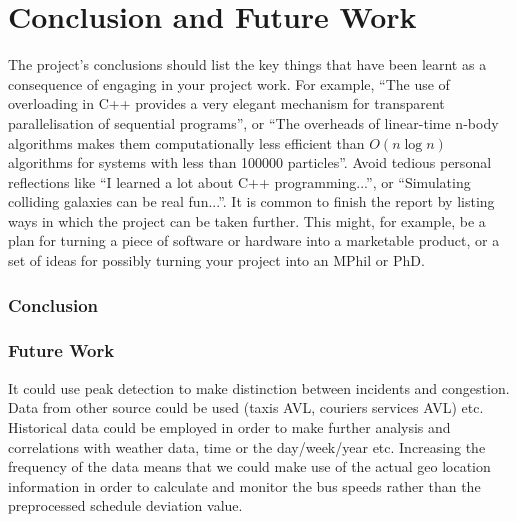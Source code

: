 \chapter{Conclusion and Future Work}

The project's conclusions should list the key things that have been learnt as a consequence of engaging in your project work. For example, ``The use of overloading in C++ provides a very elegant mechanism for transparent parallelisation of sequential programs'', or ``The overheads of linear-time n-body algorithms makes them computationally less efficient than $O(n \log n)$ algorithms for systems with less than 100000 particles''. Avoid tedious personal reflections like ``I learned a lot about C++ programming...'', or ``Simulating colliding galaxies can be real fun...''. It is common to finish the report by listing ways in which the project can be taken further. This might, for example, be a plan for turning a piece of software or hardware into a marketable product, or a set of ideas for possibly turning your project into an MPhil or PhD.

\subsection{Conclusion}

\subsection{Future Work}
It could use peak detection to make distinction between incidents and congestion.
Data from other source could be used (taxis AVL, couriers services AVL) etc.
Historical data could be employed in order to make further analysis and correlations with weather data, time or the day/week/year etc.
Increasing the frequency of the data means that we could make use of the actual geo location information in order to calculate and monitor the bus speeds rather than the preprocessed schedule deviation value.
